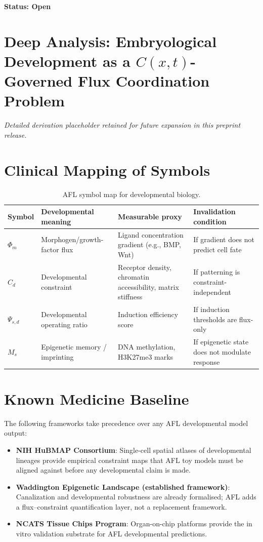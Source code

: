 \documentclass[11pt]{article}
\begin{document}
\textbf{Status: Open}


\section{Deep Analysis: Embryological Development as a $C(x,t)$-Governed Flux Coordination Problem}
\noindent\textit{Detailed derivation placeholder retained for future expansion in this preprint release.}

\section{Clinical Mapping of Symbols}

\begin{table}[h!]
\centering
\caption{AFL symbol map for developmental biology.}
\begin{tabular}{llll}
\toprule
\textbf{Symbol} & \textbf{Developmental meaning} & \textbf{Measurable proxy} & \textbf{Invalidation condition} \\
\midrule
$\Phi_m$ & Morphogen/growth-factor flux & Ligand concentration gradient (e.g., BMP, Wnt) & If gradient does not predict cell fate \\
$C_d$ & Developmental constraint & Receptor density, chromatin accessibility, matrix stiffness & If patterning is constraint-independent \\
$\Psi_{s,d}$ & Developmental operating ratio & Induction efficiency score & If induction thresholds are flux-only \\
$M_s$ & Epigenetic memory / imprinting & DNA methylation, H3K27me3 marks & If epigenetic state does not modulate response \\
\bottomrule
\end{tabular}
\end{table}

\section{Known Medicine Baseline}

The following frameworks take precedence over any AFL developmental model output:
\begin{itemize}
  \item \textbf{NIH HuBMAP Consortium}: Single-cell spatial atlases of developmental lineages provide empirical constraint maps that AFL toy models must be aligned against before any developmental claim is made.
  \item \textbf{Waddington Epigenetic Landscape (established framework)}: Canalization and developmental robustness are already formalised; AFL adds a flux--constraint quantification layer, not a replacement framework.
  \item \textbf{NCATS Tissue Chips Program}: Organ-on-chip platforms provide the in vitro validation substrate for AFL developmental predictions.
\end{itemize}
\end{document}
